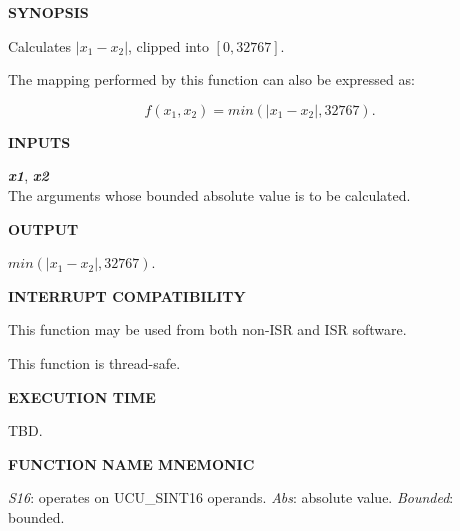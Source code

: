 \noindent\textbf{SYNOPSIS}
\begin{list}{}{\setlength{\leftmargin}{0.25in}\setlength{\topsep}{0.0in}}
\item Calculates $|x_1-x_2|$, clipped into $[0, 32767]$.
\item The mapping performed by this function can also be expressed as:

      \begin{equation}
      \label{eq:cbaf0:sscf1:sfss1:01}
      f(x_1, x_2) = min(|x_1 - x_2|, 32767) .
      \end{equation}
\end{list}
\vspace{2.8ex}

\noindent\textbf{INPUTS}
\begin{list}{}{\setlength{\leftmargin}{0.5in}\setlength{\itemindent}{-0.25in}\setlength{\topsep}{0.0in}\setlength{\partopsep}{0.0in}}
\item \emph{\textbf{x1}}, \emph{\textbf{x2}}\\
      The arguments whose bounded absolute value is to be calculated.
\end{list}
\vspace{2.8ex}

\noindent\textbf{OUTPUT}
\begin{list}{}{\setlength{\leftmargin}{0.25in}\setlength{\topsep}{0.0in}}
\item $min(|x_1 - x_2|, 32767)$.
\end{list}
\vspace{2.8ex}

\noindent\textbf{INTERRUPT COMPATIBILITY}
\begin{list}{}{\setlength{\leftmargin}{0.25in}\setlength{\topsep}{0.0in}}
\item This function may be used from both non-ISR and ISR software.
\item This function is thread-safe.
\end{list}
\vspace{2.8ex}

\noindent\textbf{EXECUTION TIME}
\begin{list}{}{\setlength{\leftmargin}{0.25in}\setlength{\topsep}{0.0in}}
\item TBD.
\end{list}
\vspace{2.8ex}

\noindent\textbf{FUNCTION NAME MNEMONIC}
\begin{list}{}{\setlength{\leftmargin}{0.25in}\setlength{\topsep}{0.0in}}
\item \emph{S16}:       operates on UCU\_SINT16 operands.
      \emph{Abs}:       absolute value.
      \emph{Bounded}:   bounded.
\end{list}


